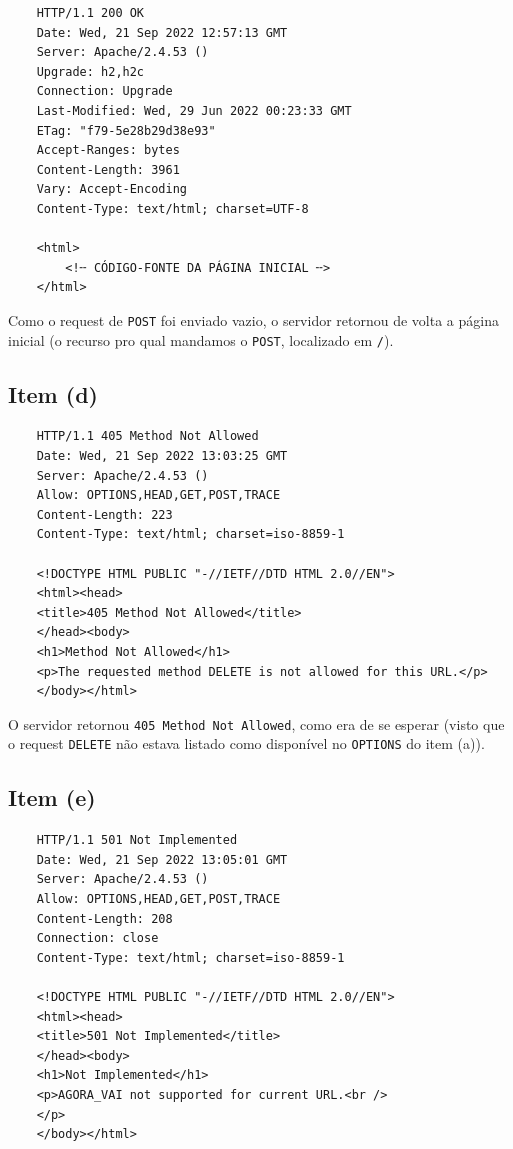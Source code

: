 \documentclass{article}
\begin{document}
\begin{verbatim}
    HTTP/1.1 200 OK
    Date: Wed, 21 Sep 2022 12:57:13 GMT
    Server: Apache/2.4.53 ()
    Upgrade: h2,h2c
    Connection: Upgrade
    Last-Modified: Wed, 29 Jun 2022 00:23:33 GMT
    ETag: "f79-5e28b29d38e93"
    Accept-Ranges: bytes
    Content-Length: 3961
    Vary: Accept-Encoding
    Content-Type: text/html; charset=UTF-8

    <html>
        <!╌ CÓDIGO-FONTE DA PÁGINA INICIAL ╌>
    </html>
\end{verbatim}

Como o request de \texttt{POST} foi enviado vazio, o servidor retornou de volta a página inicial (o recurso pro qual mandamos o \texttt{POST}, localizado em \texttt{/}).

\subsection*{Item (d)}

\begin{verbatim}
    HTTP/1.1 405 Method Not Allowed
    Date: Wed, 21 Sep 2022 13:03:25 GMT
    Server: Apache/2.4.53 ()
    Allow: OPTIONS,HEAD,GET,POST,TRACE
    Content-Length: 223
    Content-Type: text/html; charset=iso-8859-1
    
    <!DOCTYPE HTML PUBLIC "-//IETF//DTD HTML 2.0//EN">
    <html><head>
    <title>405 Method Not Allowed</title>
    </head><body>
    <h1>Method Not Allowed</h1>
    <p>The requested method DELETE is not allowed for this URL.</p>
    </body></html>     
\end{verbatim}

O servidor retornou \texttt{405 Method Not Allowed}, como era de se esperar (visto que o request \texttt{DELETE} não estava listado como disponível no \texttt{OPTIONS} do item (a)).

\subsection*{Item (e)}

\begin{verbatim}
    HTTP/1.1 501 Not Implemented
    Date: Wed, 21 Sep 2022 13:05:01 GMT
    Server: Apache/2.4.53 ()
    Allow: OPTIONS,HEAD,GET,POST,TRACE
    Content-Length: 208
    Connection: close
    Content-Type: text/html; charset=iso-8859-1

    <!DOCTYPE HTML PUBLIC "-//IETF//DTD HTML 2.0//EN">
    <html><head>
    <title>501 Not Implemented</title>
    </head><body>
    <h1>Not Implemented</h1>
    <p>AGORA_VAI not supported for current URL.<br />
    </p>
    </body></html>
\end{verbatim}
\end{document}
